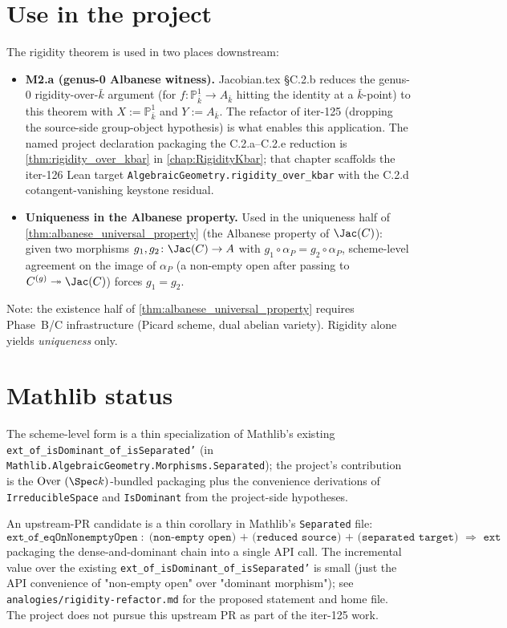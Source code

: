 \section{Use in the project}

The rigidity theorem is used in two places downstream:

\begin{itemize}
  \item \textbf{M2.a (genus-0 Albanese witness).} Jacobian.tex \S C.2.b reduces the genus-0 rigidity-over-\(\bar k\) argument (for \(f \colon \mathbb P^1_{\bar k} \to A_{\bar k}\) hitting the identity at a \(\bar k\)-point) to this theorem with \(X := \mathbb P^1_{\bar k}\) and \(Y := A_{\bar k}\). The refactor of iter-125 (dropping the source-side group-object hypothesis) is what enables this application. The named project declaration packaging the C.2.a–C.2.e reduction is \cref{thm:rigidity_over_kbar} in \cref{chap:RigidityKbar}; that chapter scaffolds the iter-126 Lean target \texttt{AlgebraicGeometry.rigidity\_over\_kbar} with the C.2.d cotangent-vanishing keystone residual.
  \item \textbf{Uniqueness in the Albanese property.} Used in the uniqueness half of \cref{thm:albanese_universal_property} (the Albanese property of \(\Jac(C)\)): given two morphisms \(g_1, g_2 \colon \Jac(C) \to A\) with \(g_1 \circ \alpha_P = g_2 \circ \alpha_P\), scheme-level agreement on the image of \(\alpha_P\) (a non-empty open after passing to \(C^{(g)} \twoheadrightarrow \Jac(C)\)) forces \(g_1 = g_2\).
\end{itemize}

Note: the existence half of \cref{thm:albanese_universal_property} requires Phase~B/C infrastructure (Picard scheme, dual abelian variety). Rigidity alone yields \emph{uniqueness} only.

\section{Mathlib status}

The scheme-level form is a thin specialization of Mathlib's existing \texttt{ext\_of\_isDominant\_of\_isSeparated'} (in \texttt{Mathlib.AlgebraicGeometry.Morphisms.Separated}); the project's contribution is the \(\mathrm{Over}\ (\Spec k)\)-bundled packaging plus the convenience derivations of \texttt{IrreducibleSpace} and \texttt{IsDominant} from the project-side hypotheses.

An upstream-PR candidate is a thin corollary in Mathlib's \texttt{Separated} file:
\[
  \texttt{ext\_of\_eqOnNonemptyOpen} \;\colon\; \texttt{(non-empty open) + (reduced source) + (separated target) }\Rightarrow\texttt{ ext}
\]
packaging the dense-and-dominant chain into a single API call. The incremental value over the existing \texttt{ext\_of\_isDominant\_of\_isSeparated'} is small (just the API convenience of "non-empty open" over "dominant morphism"); see \texttt{analogies/rigidity-refactor.md} for the proposed statement and home file. The project does not pursue this upstream PR as part of the iter-125 work.
